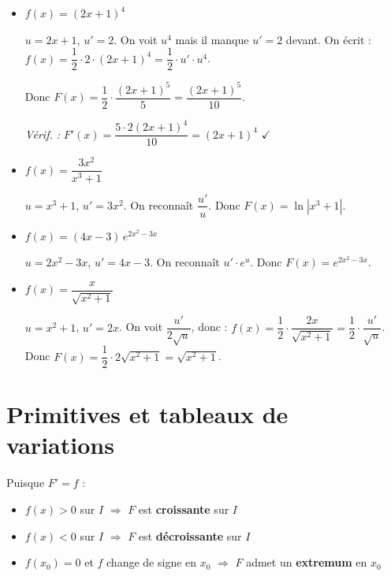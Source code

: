 \begin{exemple}
  \begin{itemize}

    \item $f(x) = (2x+1)^4$

    $u = 2x+1$, $u' = 2$.
    On voit $u^4$ mais il manque $u'=2$ devant.
    On \'{e}crit : $f(x) = \dfrac{1}{2} \cdot 2 \cdot (2x+1)^4 = \dfrac{1}{2} \cdot u' \cdot u^4$.

    Donc $F(x) = \dfrac{1}{2} \cdot \dfrac{(2x+1)^5}{5} = \dfrac{(2x+1)^5}{10}$.

    \textit{V\'{e}rif. :} $F'(x) = \dfrac{5 \cdot 2(2x+1)^4}{10} = (2x+1)^4$ $\checkmark$

    \bigskip
    \item $f(x) = \dfrac{3x^2}{x^3 + 1}$

    $u = x^3+1$, $u' = 3x^2$.
    On reconna\^{i}t $\dfrac{u'}{u}$.
    Donc $F(x) = \ln|x^3+1|$.

    \bigskip
    \item $f(x) = (4x-3)\,e^{2x^2 - 3x}$

    $u = 2x^2-3x$, $u' = 4x-3$.
    On reconna\^{i}t $u' \cdot e^u$.
    Donc $F(x) = e^{2x^2 - 3x}$.

    \bigskip
    \item $f(x) = \dfrac{x}{\sqrt{x^2+1}}$

    $u = x^2+1$, $u' = 2x$.
    On voit $\dfrac{u'}{2\sqrt{u}}$, donc :
    $f(x) = \dfrac{1}{2} \cdot \dfrac{2x}{\sqrt{x^2+1}} = \dfrac{1}{2} \cdot \dfrac{u'}{\sqrt{u}}$.
    Donc $F(x) = \dfrac{1}{2} \cdot 2\sqrt{x^2+1} = \sqrt{x^2+1}$.

  \end{itemize}
\end{exemple}

\section{Primitives et tableaux de variations}

\begin{propriete}
  Puisque $F' = f$ :
  \begin{itemize}
    \item $f(x) > 0$ sur $I$ $\Rightarrow$ $F$ est \textbf{croissante} sur $I$
    \item $f(x) < 0$ sur $I$ $\Rightarrow$ $F$ est \textbf{d\'{e}croissante} sur $I$
    \item $f(x_0) = 0$ et $f$ change de signe en $x_0$
          $\Rightarrow$ $F$ admet un \textbf{extremum} en $x_0$
  \end{itemize}
\end{propriete}

